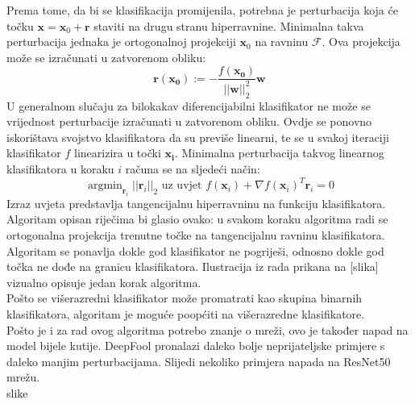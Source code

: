 \documentclass[utf8, diplomski]{fer}
\begin{document}
Prema tome, da bi se klasifikacija promijenila, potrebna je perturbacija koja će točku $\boldsymbol{x} = \boldsymbol{x}_{0} + \boldsymbol{r}$ staviti na drugu stranu hiperravnine. Minimalna takva perturbacija jednaka je ortogonalnoj projekciji $\boldsymbol{x}_{0}$ na ravninu $\mathscr{F}$. Ova projekcija može se izračunati u zatvorenom obliku:
\begin{equation}
	\boldsymbol{r}(\boldsymbol{x_{0}}) := - \frac{f(\boldsymbol{x_{0}})}{||\boldsymbol{w}||_{2}^{2}}\boldsymbol{w}
\end{equation}
U generalnom slučaju za bilokakav diferencijabilni klasifikator ne može se vrijednost perturbacije izračunati u zatvorenom obliku. Ovdje se ponovno iskorištava svojstvo klasifikatora da su previše linearni, te se u svakoj iteraciji klasifikator $f$ linearizira u točki $\boldsymbol{x_{i}}$. Minimalna perturbacija takvog linearnog klasifikatora u koraku $i$ računa se na sljedeći način:
\begin{equation}
	\mathop{argmin}_{\boldsymbol{r}_{i}}||\boldsymbol{r}_{i}||_{2} \text{ uz uvjet } f(\boldsymbol{x}_{i}) + \nabla f(\boldsymbol{x}_{i})^{T}\boldsymbol{r}_{i} = 0
\end{equation}
Izraz uvjeta predstavlja tangencijalnu hiperravninu na funkciju klasifikatora. Algoritam opisan riječima bi glasio ovako: u svakom koraku algoritma radi se ortogonalna projekcija trenutne točke na tangencijalnu ravninu klasifikatora. Algoritam se ponavlja dokle god klasifikator ne pogriješi, odnosno dokle god točka ne dođe na granicu klasifikatora. Ilustracija iz rada prikana na [slika] vizualno opisuje jedan korak algoritma. \\
Pošto se višerazredni klasifikator može promatrati kao skupina binarnih klasifikatora, algoritam je moguće poopćiti na višerazredne klasifikatore. \\
Pošto je i za rad ovog algoritma potrebo znanje o mreži, ovo je također napad na model bijele kutije. DeepFool pronalazi daleko bolje neprijateljske primjere s daleko manjim perturbacijama. Slijedi nekoliko primjera napada na ResNet50 mrežu.\\
slike
\end{document}
